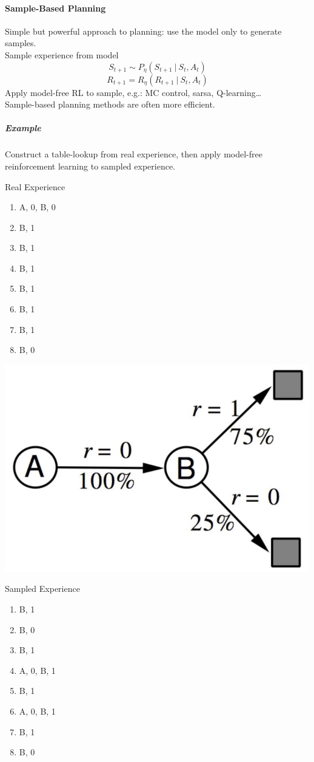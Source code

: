 \documentclass[10pt]{report}
\begin{document}
\paragraph{Sample-Based Planning} Simple but powerful approach to planning: use the model only to generate samples.\\
Sample experience from model
$$S_{t+1} \sim P_\eta(S_{t+1}\:|\:S_t,A_t)$$
$$R_{t+1} = R_\eta(R_{t+1}\:|\:S_t,A_t)$$
Apply model-free RL to sample, e.g.: MC control, sarsa, Q-learning\ldots\\
Sample-based planning methods are often more efficient.
\subparagraph{Example} Construct a table-lookup from real experience, then apply model-free reinforcement learning to sampled experience.
\begin{multicols}{3}
Real Experience
\begin{enumerate}
	\item A, 0, B, 0
	\item B, 1
	\item B, 1
	\item B, 1
	\item B, 1
	\item B, 1
	\item B, 1
	\item B, 0
\end{enumerate}
\columnbreak
\begin{center}
	\includegraphics[scale=0.33]{174.png}
\end{center}
\columnbreak
Sampled Experience
\begin{enumerate}
	\item B, 1
	\item B, 0
	\item B, 1
	\item A, 0, B, 1
	\item B, 1
	\item A, 0, B, 1
	\item B, 1
	\item B, 0
\end{enumerate}
\end{multicols}
\end{document}
